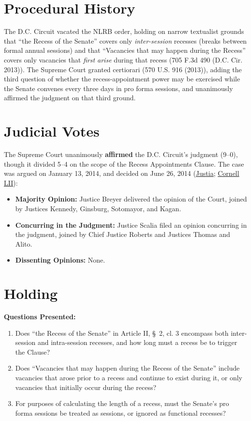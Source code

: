 \documentclass[12pt]{article}
\begin{document}
\section{Procedural History}
The D.C. Circuit vacated the NLRB order, holding on narrow textualist grounds that ``the Recess of the Senate'' covers only \emph{inter-session} recesses (breaks between formal annual sessions) and that ``Vacancies that may happen during the Recess'' covers only vacancies that \emph{first arise} during that recess (705 F.3d 490 (D.C. Cir. 2013)). The Supreme Court granted certiorari (570 U.S. 916 (2013)), adding the third question of whether the recess-appointment power may be exercised while the Senate convenes every three days in pro forma sessions, and unanimously affirmed the judgment on that third ground.

\section{Judicial Votes}
The Supreme Court unanimously \textbf{affirmed} the D.C. Circuit's judgment (9--0), though it divided 5--4 on the scope of the Recess Appointments Clause. The case was argued on January 13, 2014, and decided on June 26, 2014 (\href{https://supreme.justia.com/cases/federal/us/573/513/}{Justia}; \href{https://www.law.cornell.edu/supremecourt/text/12-1281}{Cornell LII}):

\begin{itemize}
    \item \textbf{Majority Opinion:} Justice Breyer delivered the opinion of the Court, joined by Justices Kennedy, Ginsburg, Sotomayor, and Kagan.
    \item \textbf{Concurring in the Judgment:} Justice Scalia filed an opinion concurring in the judgment, joined by Chief Justice Roberts and Justices Thomas and Alito.
    \item \textbf{Dissenting Opinions:} None.
\end{itemize}

\section{Holding}
\textbf{Questions Presented:}

\begin{enumerate}
  \item Does ``the Recess of the Senate'' in Article II, \S~2, cl. 3 encompass both inter-session and intra-session recesses, and how long must a recess be to trigger the Clause?
  \item Does ``Vacancies that may happen during the Recess of the Senate'' include vacancies that arose prior to a recess and continue to exist during it, or only vacancies that initially occur during the recess?
  \item For purposes of calculating the length of a recess, must the Senate's pro forma sessions be treated as sessions, or ignored as functional recesses?
\end{enumerate}
\end{document}
